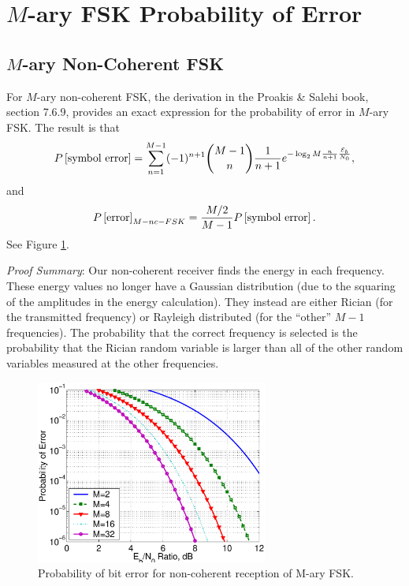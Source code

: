 

\announcements{
}

\section{$M$-ary FSK Probability of Error}

\subsection{$M$-ary Non-Coherent FSK}

For $M$-ary non-coherent FSK, the derivation in the Proakis \& Salehi book, section 7.6.9, provides an exact expression for the probability of error in $M$-ary FSK.  The result is that
\[
P\left[{\mbox{symbol error}}\right] = \sum_{n=1}^{M-1} (-1)^{n+1} {M-1 \choose
n} \frac{1}{n+1} e^{-\log_2 M \frac{n}{n+1}\frac{\mathcal{E}_b}{N_0}},
\]
and
\[
  P\left[{\mbox{error}}\right]_{M-nc-FSK} = \frac{M/2}{M-1}P\left[{\mbox{symbol error}}\right].
\]
See Figure \ref{F:BER_NCFSK_Mary}.

\textit{Proof Summary}:  Our non-coherent receiver finds the energy in each frequency.  These energy values no longer have a Gaussian distribution (due to the squaring of the amplitudes in the energy calculation).  They instead are either Rician (for the transmitted frequency) or Rayleigh distributed (for the ``other'' $M-1$ frequencies).  The probability that the correct frequency is selected is the probability that the Rician random variable is larger than all of the other random variables measured at the other frequencies.

\begin{figure}[htbp]
  \centerline{\includegraphics[width=3in]{../images/plotBER_NCFSK_Mary.eps} }
  \caption{Probability of bit error for non-coherent reception of M-ary FSK.}
  \label{F:BER_NCFSK_Mary}
\end{figure}

